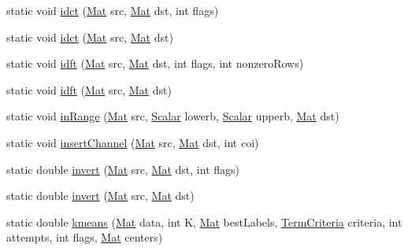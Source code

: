\begin{DoxyCompactItemize}
static void \mbox{\hyperlink{classorg_1_1opencv_1_1core_1_1_core_a64eb690877f2d4ac16c1b1c3375c0b7b}{idct}} (\mbox{\hyperlink{classorg_1_1opencv_1_1core_1_1_mat}{Mat}} src, \mbox{\hyperlink{classorg_1_1opencv_1_1core_1_1_mat}{Mat}} dst, int flags)
\item 
static void \mbox{\hyperlink{classorg_1_1opencv_1_1core_1_1_core_a4f55e86b56025dd6bd516a43c2b7ad46}{idct}} (\mbox{\hyperlink{classorg_1_1opencv_1_1core_1_1_mat}{Mat}} src, \mbox{\hyperlink{classorg_1_1opencv_1_1core_1_1_mat}{Mat}} dst)
\item 
static void \mbox{\hyperlink{classorg_1_1opencv_1_1core_1_1_core_a4fc0b0f22fef014f5e602e8d5b367a44}{idft}} (\mbox{\hyperlink{classorg_1_1opencv_1_1core_1_1_mat}{Mat}} src, \mbox{\hyperlink{classorg_1_1opencv_1_1core_1_1_mat}{Mat}} dst, int flags, int nonzero\+Rows)
\item 
static void \mbox{\hyperlink{classorg_1_1opencv_1_1core_1_1_core_a117c710f5f551746f7e4e836a271f853}{idft}} (\mbox{\hyperlink{classorg_1_1opencv_1_1core_1_1_mat}{Mat}} src, \mbox{\hyperlink{classorg_1_1opencv_1_1core_1_1_mat}{Mat}} dst)
\item 
static void \mbox{\hyperlink{classorg_1_1opencv_1_1core_1_1_core_adda843559663a35e9a710c93b1f86096}{in\+Range}} (\mbox{\hyperlink{classorg_1_1opencv_1_1core_1_1_mat}{Mat}} src, \mbox{\hyperlink{classorg_1_1opencv_1_1core_1_1_scalar}{Scalar}} lowerb, \mbox{\hyperlink{classorg_1_1opencv_1_1core_1_1_scalar}{Scalar}} upperb, \mbox{\hyperlink{classorg_1_1opencv_1_1core_1_1_mat}{Mat}} dst)
\item 
static void \mbox{\hyperlink{classorg_1_1opencv_1_1core_1_1_core_aafde7d856dba7bb7446caf2caeb2dd20}{insert\+Channel}} (\mbox{\hyperlink{classorg_1_1opencv_1_1core_1_1_mat}{Mat}} src, \mbox{\hyperlink{classorg_1_1opencv_1_1core_1_1_mat}{Mat}} dst, int coi)
\item 
static double \mbox{\hyperlink{classorg_1_1opencv_1_1core_1_1_core_af7c788172a8e426cf6b6cedc8d828f1b}{invert}} (\mbox{\hyperlink{classorg_1_1opencv_1_1core_1_1_mat}{Mat}} src, \mbox{\hyperlink{classorg_1_1opencv_1_1core_1_1_mat}{Mat}} dst, int flags)
\item 
static double \mbox{\hyperlink{classorg_1_1opencv_1_1core_1_1_core_a454495bfa5d22875cd357fd28b537619}{invert}} (\mbox{\hyperlink{classorg_1_1opencv_1_1core_1_1_mat}{Mat}} src, \mbox{\hyperlink{classorg_1_1opencv_1_1core_1_1_mat}{Mat}} dst)
\item 
static double \mbox{\hyperlink{classorg_1_1opencv_1_1core_1_1_core_a9870d70cc55618004735e38a0931ab3a}{kmeans}} (\mbox{\hyperlink{classorg_1_1opencv_1_1core_1_1_mat}{Mat}} data, int K, \mbox{\hyperlink{classorg_1_1opencv_1_1core_1_1_mat}{Mat}} best\+Labels, \mbox{\hyperlink{classorg_1_1opencv_1_1core_1_1_term_criteria}{Term\+Criteria}} criteria, int attempts, int flags, \mbox{\hyperlink{classorg_1_1opencv_1_1core_1_1_mat}{Mat}} centers)

\end{DoxyCompactItemize}
